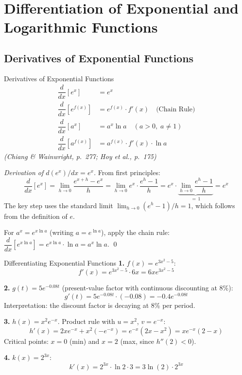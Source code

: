 \documentclass[12pt, a4paper]{article}
\theoremstyle{definition}
\newcommand{\ddd}[2]{\dfrac{d#1}{d#2}}
\begin{document}
\section{Differentiation of Exponential and Logarithmic Functions}

\subsection{Derivatives of Exponential Functions}

\begin{thmbox}{Derivatives of Exponential Functions}
\begin{align}
  \ddd{}{x}[e^x] &= e^x \label{eq:dex}\\[4pt]
  \ddd{}{x}[e^{f(x)}] &= e^{f(x)} \cdot f'(x) \quad \text{(Chain Rule)} \label{eq:dechainrule}\\[4pt]
  \ddd{}{x}[a^x] &= a^x \ln a \quad (a > 0,\; a\neq 1) \label{eq:dax}\\[4pt]
  \ddd{}{x}[a^{f(x)}] &= a^{f(x)} \cdot f'(x) \cdot \ln a \label{eq:dafxchainrule}
\end{align}
\emph{(Chiang \& Wainwright, p.\ 277; Hoy et al., p.\ 175)}
\end{thmbox}

\begin{proof}[Derivation of $d(e^x)/dx = e^x$]
From first principles:
\[
  \ddd{}{x}[e^x]
  = \lim_{h\to 0}\frac{e^{x+h}-e^x}{h}
  = \lim_{h\to 0}e^x\cdot\frac{e^h-1}{h}
  = e^x \cdot \underbrace{\lim_{h\to 0}\frac{e^h-1}{h}}_{=\,1}
  = e^x
\]
The key step uses the standard limit $\lim_{h\to 0}(e^h-1)/h=1$, which follows from the definition of $e$.

For $a^x = e^{x\ln a}$ (writing $a=e^{\ln a}$), apply the chain rule:
$\ddd{}{x}[e^{x\ln a}] = e^{x\ln a}\cdot\ln a = a^x \ln a$. \qed
\end{proof}

\begin{exbox}{Differentiating Exponential Functions}
\textbf{1.} $f(x) = e^{3x^2-5}$:
\[
  f'(x) = e^{3x^2-5} \cdot 6x = 6xe^{3x^2-5}
\]

\textbf{2.} $g(t) = 5e^{-0.08t}$ (present-value factor with continuous discounting at 8\%):
\[
  g'(t) = 5e^{-0.08t} \cdot (-0.08) = -0.4e^{-0.08t}
\]
Interpretation: the discount factor is decaying at 8\% per period.

\textbf{3.} $h(x) = x^2 e^{-x}$. Product rule with $u=x^2$, $v=e^{-x}$:
\[
  h'(x) = 2xe^{-x} + x^2(-e^{-x}) = e^{-x}(2x - x^2) = xe^{-x}(2-x)
\]
Critical points: $x=0$ (min) and $x=2$ (max, since $h''(2)<0$).

\textbf{4.} $k(x) = 2^{3x}$:
\[
  k'(x) = 2^{3x} \cdot \ln 2 \cdot 3 = 3\ln(2)\cdot 2^{3x}
\]
\end{exbox}
\end{document}
